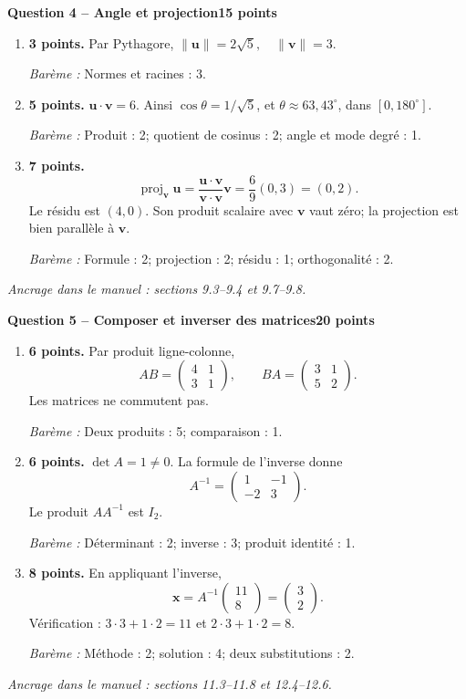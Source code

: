 \documentclass[11pt,a4paper]{article}
\begin{document}
\newpage
{\large\bfseries Question 4 -- Angle et projection}\hfill\textbf{15 points}\par
\begin{enumerate}
\item \textbf{3 points.} Par Pythagore, \(\|\mathbf u\|=2\sqrt5,\quad\|\mathbf v\|=3\).
\par{\small\textit{Barème : }Normes et racines : 3.}
\item \textbf{5 points.} \(\mathbf u\cdot\mathbf v=6\). Ainsi \(\cos\theta=1/\sqrt5\), et \(\theta\approx 63{,}43^\circ\), dans \([0,180^\circ]\).
\par{\small\textit{Barème : }Produit : 2; quotient de cosinus : 2; angle et mode degré : 1.}
\item \textbf{7 points.} \[\operatorname{proj}_{\mathbf v}\mathbf u=\frac{\mathbf u\cdot\mathbf v}{\mathbf v\cdot\mathbf v}\mathbf v=\frac69(0,3)=(0,2).\] Le résidu est \((4,0)\). Son produit scalaire avec \(\mathbf v\) vaut zéro; la projection est bien parallèle à \(\mathbf v\).
\par{\small\textit{Barème : }Formule : 2; projection : 2; résidu : 1; orthogonalité : 2.}
\end{enumerate}
\vfill {\small\textit{Ancrage dans le manuel : sections 9.3--9.4 et 9.7--9.8.}}

\newpage
{\large\bfseries Question 5 -- Composer et inverser des matrices}\hfill\textbf{20 points}\par
\begin{enumerate}
\item \textbf{6 points.} Par produit ligne-colonne, \[AB=\begin{pmatrix}4 & 1\\3 & 1\end{pmatrix},\qquad BA=\begin{pmatrix}3 & 1\\5 & 2\end{pmatrix}.\] Les matrices ne commutent pas.
\par{\small\textit{Barème : }Deux produits : 5; comparaison : 1.}
\item \textbf{6 points.} \(\det A=1\ne0\). La formule de l’inverse donne \[A^{-1}=\begin{pmatrix}1 & -1\\-2 & 3\end{pmatrix}.\] Le produit \(AA^{-1}\) est \(I_2\).
\par{\small\textit{Barème : }Déterminant : 2; inverse : 3; produit identité : 1.}
\item \textbf{8 points.} En appliquant l’inverse, \[\mathbf x=A^{-1}\begin{pmatrix}11\\8\end{pmatrix}=\begin{pmatrix}3\\2\end{pmatrix}.\] Vérification : \(3\cdot3+1\cdot2=11\) et \(2\cdot3+1\cdot2=8\).
\par{\small\textit{Barème : }Méthode : 2; solution : 4; deux substitutions : 2.}
\end{enumerate}
\vfill {\small\textit{Ancrage dans le manuel : sections 11.3--11.8 et 12.4--12.6.}}
\end{document}
